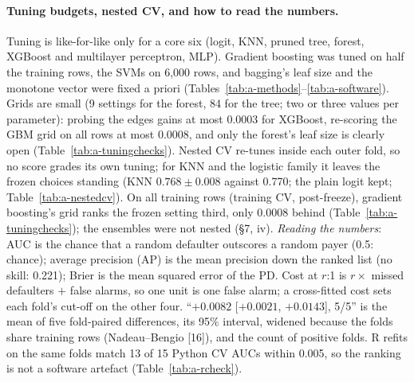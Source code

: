 \paragraph{Tuning budgets, nested CV, and how to read the numbers.}
Tuning is like-for-like only for a core six (logit, KNN, pruned tree, forest, XGBoost and multilayer perceptron, MLP). Gradient boosting was tuned on half the training rows, the SVMs on 6,000 rows, and bagging's leaf size and the monotone vector were fixed a priori (Tables~\ref{tab:a-methods}--\ref{tab:a-software}). Grids are small (9 settings for the forest, 84 for the tree; two or three values per parameter): probing the edges gains at most 0.0003 for XGBoost, re-scoring the GBM grid on all rows at most 0.0008, and only the forest's leaf size is clearly open (Table~\ref{tab:a-tuningchecks}). Nested CV re-tunes inside each outer fold, so no score grades its own tuning; for KNN and the logistic family it leaves the frozen choices standing (KNN $0.768 \pm 0.008$ against 0.770; the plain logit kept; Table~\ref{tab:a-nestedcv}). On all training rows (training CV, post-freeze), gradient boosting's grid ranks the frozen setting third, only 0.0008 behind (Table~\ref{tab:a-tuningchecks}); the ensembles were not nested (\S7, iv). \emph{Reading the numbers}: AUC is the chance that a random defaulter outscores a random payer (0.5: chance); average precision (AP) is the mean precision down the ranked list (no skill: 0.221); Brier is the mean squared error of the PD. Cost at $r$:1 is $r \times$ missed defaulters $+$ false alarms, so one unit is one false alarm; a cross-fitted cost sets each fold's cut-off on the other four. ``$+0.0082$ [$+0.0021$, $+0.0143$], 5/5'' is the mean of five fold-paired differences, its 95\% interval, widened because the folds share training rows (Nadeau--Bengio [16]), and the count of positive folds. R refits on the same folds match 13 of 15 Python CV AUCs within 0.005, so the ranking is not a software artefact (Table~\ref{tab:a-rcheck}).
